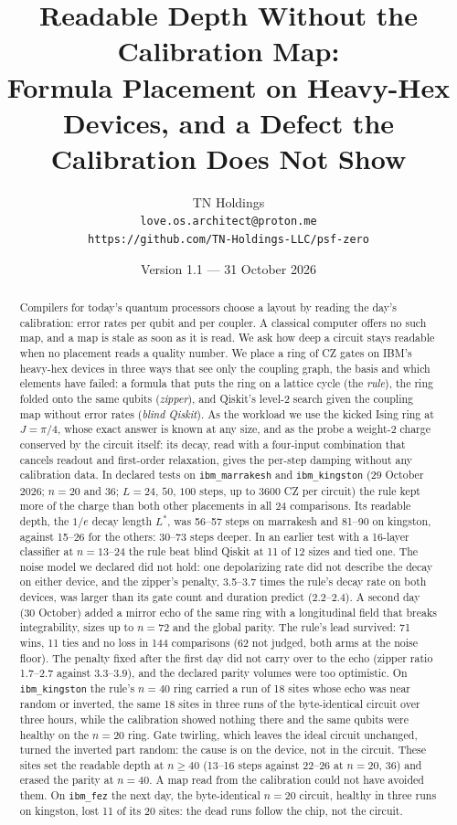 \documentclass[11pt]{article}
\title{Readable Depth Without the Calibration Map:\\
Formula Placement on Heavy-Hex Devices, and a Defect the Calibration Does Not Show}
\author{TN Holdings\\
\texttt{love.os.architect@proton.me}\\
\texttt{https://github.com/TN-Holdings-LLC/psf-zero}}
\date{Version 1.1 --- 31 October 2026}
\begin{document}
\maketitle

\begin{abstract}
Compilers for today's quantum processors choose a layout by reading the day's calibration: error rates per qubit
and per coupler. A classical computer offers no such map, and a map is stale as soon as it is read. We ask how deep a
circuit stays readable when no placement reads a quality number. We place a ring of CZ gates on IBM's heavy-hex
devices in three ways that see only the coupling graph, the basis and which elements have failed: a formula that puts
the ring on a lattice cycle (the \emph{rule}), the ring folded onto the same qubits (\emph{zipper}), and Qiskit's
level-2 search given the coupling map without error rates (\emph{blind Qiskit}). As the workload we use the kicked
Ising ring at $J=\pi/4$, whose exact answer is known at any size, and as the probe a weight-2 charge conserved by the
circuit itself: its decay, read with a four-input combination that cancels readout and first-order relaxation, gives
the per-step damping without any calibration data. In declared tests on \texttt{ibm\_marrakesh} and
\texttt{ibm\_kingston} (29 October 2026; $n=20$ and $36$; $L=24$, $50$, $100$ steps, up to 3600 CZ per circuit) the
rule kept more of the charge than both other placements in all 24 comparisons. Its readable depth, the $1/e$ decay
length $L^*$, was 56--57 steps on marrakesh and 81--90 on kingston, against 15--26 for the others: 30--73 steps
deeper. In an earlier test with a 16-layer classifier at $n=13$--$24$ the rule beat blind Qiskit at 11 of 12 sizes
and tied one. The noise model we declared did not hold: one depolarizing rate did not describe the decay on either
device, and the zipper's penalty, 3.5--3.7 times the rule's decay rate on both devices, was larger than its gate count
and duration predict (2.2--2.4). A second day (30 October) added a mirror echo of the same ring with a longitudinal
field that breaks integrability, sizes up to $n=72$ and the global parity. The rule's lead survived: 71 wins, 11 ties
and no loss in 144 comparisons (62 not judged, both arms at the noise floor). The penalty fixed after the first day
did not carry over to the echo (zipper ratio 1.7--2.7 against $3.3$--$3.9$), and the declared parity volumes were too
optimistic. On \texttt{ibm\_kingston} the rule's $n=40$ ring carried a run of 18 sites whose echo was near random or
inverted, the same 18 sites in three runs of the byte-identical circuit over three hours, while the calibration showed
nothing there and the same qubits were healthy on the $n=20$ ring. Gate twirling, which leaves the ideal circuit
unchanged, turned the inverted part random: the cause is on the device, not in the circuit. These sites set the
readable depth at $n\ge40$ (13--16 steps against 22--26 at $n=20$, 36) and erased the parity at $n=40$. A map read
from the calibration could not have avoided them. On \texttt{ibm\_fez} the next day, the byte-identical $n=20$
circuit, healthy in three runs on kingston, lost 11 of its 20 sites: the dead runs follow the chip, not the circuit.
\end{abstract}
\end{document}
